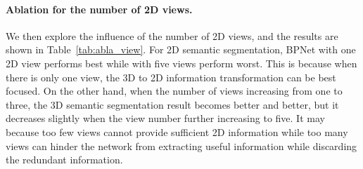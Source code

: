 \documentclass[final]{cvpr}
\begin{document}
\vspace{-4mm}
\paragraph{Ablation for the number of 2D views.}


We then explore the influence of the number of 2D views, and the results are shown in Table~\ref{tab:abla_view}.
For 2D semantic segmentation, BPNet with one 2D view performs best while with five views perform worst.
This is because when there is only one view, the 3D to 2D information transformation can be best focused.
On the other hand, when the number of views increasing from one to three, the 3D semantic segmentation result becomes better and better, but it decreases slightly when the view number further increasing to five.
It may because too few views cannot provide sufficient 2D information while too many views can hinder the network from extracting useful information while discarding the redundant information.




\begin{table}[!t]
	\centering
	\renewcommand{\tabcolsep}{9pt}
	
	\vspace*{0.5mm}
	\caption{
		2D and 3D semantic segmentation results of different voxel sizes on the validation set of ScanNetV2.
	}
	\label{tab:abla_voxel}
	\vspace{-5mm}
\end{table}
\end{document}
